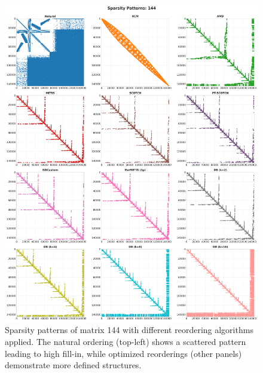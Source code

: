 \begin{figure}[h]
\centering
\includegraphics[width=\textwidth]{fig/res/144_sparsity_patterns.png}
\caption{Sparsity patterns of matrix 144 with different reordering algorithms applied. The natural ordering (top-left) shows a scattered pattern leading to high fill-in, while optimized reorderings (other panels) demonstrate more defined structures.}
\label{fig:144-sparsity-patterns}
\end{figure}

